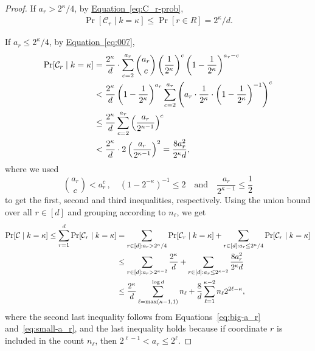 \documentclass[11pt]{article}
\numberwithin{equation}{section}
\theoremstyle{definition}
\theoremstyle{plain}
\newcommand{\expeqref}[2]{\hyperref[#2]{#1~\eqref{#2}}}
\newcommand{\cC}{\ensuremath{\mathcal{C}}}
\begin{document}
\begin{proof}
If $a_r > 2^{\kappa}/4$, by \expeqref{Equation}{eq:C_r-prob},
\begin{align}
\Pr[\cC_r \mid k = \kappa] \leq \Pr[r \in R] = 2^{\kappa}/d. \label{eq:big-a_r}
\end{align}

If $a_r \leq 2^{\kappa}/4$, by \expeqref{Equation}{eq:007},
\begin{align}
\Pr[\cC_r \mid k = \kappa] &= \frac{2^{\kappa}}{d}\cdot \sum\limits_{c = 2}^{a_r} \binom{a_r}{c} \left(\frac{1}{2^{\kappa}} \right)^c \left(1-\frac{1}{2^{\kappa}} \right)^{a_r-c} \notag \\
&< \frac{2^{\kappa}}{d} \left(1-\frac{1}{2^{\kappa}}\right)^{a_r} \sum_{c = 2}^{a_r} \left( a_r \cdot \frac{1}{2^{\kappa}} \cdot \left( 1-\frac{1}{2^{\kappa}} \right)^{-1} \right)^c  \notag \\
&\leq \frac{2^{\kappa}}{d} \sum_{c = 2}^{a_r} \left( \frac{a_r}{2^{\kappa-1}} \right)^c \notag \\
%
&< \frac{2^{\kappa}}{d} \cdot 2\left( \frac{a_r}{2^{\kappa-1}} \right)^2
= \frac{8a^2_r}{2^{\kappa} d}, \label{eq:small-a_r}
\end{align}
where we used
%
\[
  \binom{a_r}{c} < a_r^c \, , \quad (1 - 2^{-\kappa})^{-1} \leq
  2\quad\text{and}\quad \frac{a_r}{2^{\kappa-1}} \leq \frac{1}{2}
\]
%
%
to get the first, second and third inequalities, respectively.
%
Using
the   %
union bound over all $r \in [d]$ and grouping according to $n_\ell$,
we get
\begin{align}
\Pr[\cC \mid k = \kappa] \leq \sum_{r=1}^d \Pr[\cC_r \mid k = \kappa]
&= \sum_{r \in [d] : a_r > 2^\kappa/4} \Pr[\cC_r \mid k = \kappa] + \sum_{r \in [d]: a_r \leq 2^\kappa/4} \Pr[\cC_r \mid k = \kappa] \notag \\
&\leq \sum_{r \in [d] : a_r > 2^{\kappa-2}} \frac{2^{\kappa}}{d} + \sum_{r \in [d]: a_r \leq 2^{\kappa-2}} \frac{8a^2_r}{2^{\kappa} d} \notag \\
&\leq \frac{2^{\kappa}}{d} \sum\limits_{\ell = \max(\kappa - 1,1)}^{\log d} n_\ell + \frac{8}{d}  \sum_{\ell=1}^{\kappa-2} n_\ell 2^{2\ell - \kappa}, \label{eq:pr-c-k}
\end{align}
where the second last inequality follows from Equations~\eqref{eq:big-a_r} and~\eqref{eq:small-a_r}, and the last inequality holds because if coordinate $r$ is included in the count $n_\ell$, then $2^{\ell - 1} < a_r \leq 2^\ell$.


\end{proof}
\end{document}
